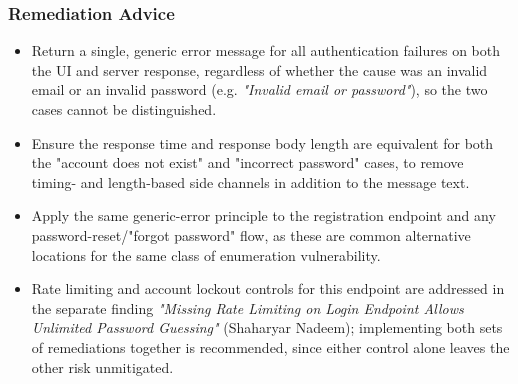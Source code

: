 \documentclass[12pt]{article}
\begin{document}
\vspace{0.5em}

\subsubsection*{Remediation Advice}
\begin{itemize}
    \item Return a single, generic error message for all authentication failures on both the UI and server response, regardless of whether the cause was an invalid email or an invalid password (e.g. \textit{"Invalid email or password"}), so the two cases cannot be distinguished.
    \item Ensure the response time and response body length are equivalent for both the "account does not exist" and "incorrect password" cases, to remove timing- and length-based side channels in addition to the message text.
    \item Apply the same generic-error principle to the registration endpoint and any password-reset/"forgot password" flow, as these are common alternative locations for the same class of enumeration vulnerability.
    \item Rate limiting and account lockout controls for this endpoint are addressed in the separate finding \textit{"Missing Rate Limiting on Login Endpoint Allows Unlimited Password Guessing"} (Shaharyar Nadeem); implementing both sets of remediations together is recommended, since either control alone leaves the other risk unmitigated.
\end{itemize}
\end{document}
